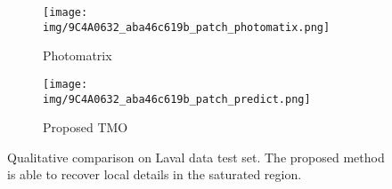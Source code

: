 \documentclass[journal]{IEEEtran}
\begin{document}
\begin{figure*}[t]
\begin{subfigure}[b]{0.24\textwidth}
        \end{subfigure}
        \begin{subfigure}[b]{0.24\textwidth}   
            \centering 
            \texttt{[image: img/9C4A0632\_aba46c619b\_patch\_photomatix.png]}
            \caption[]%
            {{\small Photomatrix \cite{photomatrix} }}    
            \label{fig:mean and std of net34}
        \end{subfigure}
        \begin{subfigure}[b]{0.24\textwidth}   
            \centering 
            \texttt{[image: img/9C4A0632\_aba46c619b\_patch\_predict.png]}
            \caption[]%
            {{\small Proposed TMO}}    
            \label{fig:mean and std of net44}
        \end{subfigure}
        \caption{Qualitative comparison on Laval data test set. The proposed method is able to recover local details in the saturated region.}
        \label{fig:Laval_9C4A0632_aba46c619b}
\end{figure*} 
\end{document}
